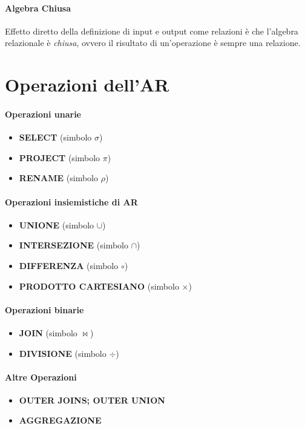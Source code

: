         \paragraph{Algebra Chiusa} Effetto diretto della definizione di input e output come relazioni è che l'algebra relazionale è \textit{chiusa}, ovvero il risultato di un'operazione è sempre una relazione.
\section{Operazioni dell'AR}
    \paragraph{Operazioni unarie}
        \begin{itemize}
            \item \textbf{SELECT} (simbolo $\sigma$)
            \item \textbf{PROJECT} (simbolo $\pi$)
            \item \textbf{RENAME} (simbolo $\rho$)
        \end{itemize}
    \paragraph{Operazioni insiemistiche di AR}
        \begin{itemize}
            \item \textbf{UNIONE} (simbolo $\cup$)
            \item \textbf{INTERSEZIONE} (simbolo $\cap$)
            \item \textbf{DIFFERENZA} (simbolo $\circ$)
            \item \textbf{PRODOTTO CARTESIANO} (simbolo $\times$)
        \end{itemize}
    \paragraph{Operazioni binarie}
        \begin{itemize}
            \item \textbf{JOIN} (simbolo $\Join$)
            \item \textbf{DIVISIONE} (simbolo $\div$)
        \end{itemize}
    \paragraph{Altre Operazioni}
        \begin{itemize}
            \item \textbf{OUTER JOINS; OUTER UNION}
            \item \textbf{AGGREGAZIONE}
        \end{itemize}
